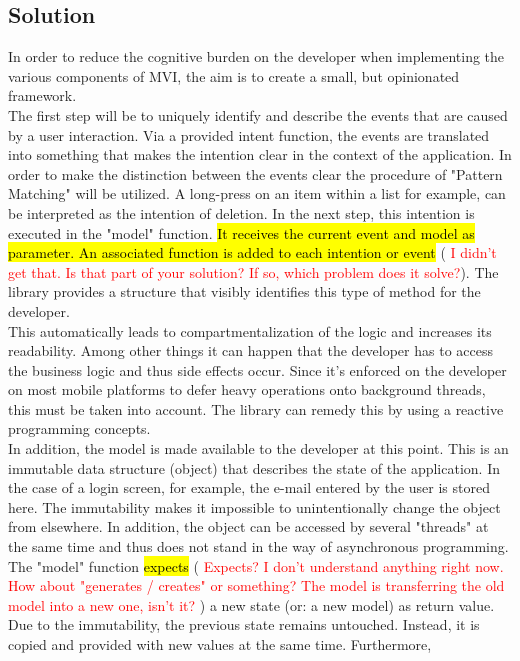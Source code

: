 \subsection{Solution}
\label{subsec:solution}

In order to reduce the cognitive burden on the developer when implementing the various components of MVI, the aim 
is to create a small, but opinionated framework.
\\
The first step will be to uniquely identify and describe the events that are caused by a user interaction.
Via a provided intent function, the events are translated into something that makes the intention clear in the context of the application.
In order to make the distinction between the events clear the procedure of "Pattern Matching" 
\cite{}
will be utilized. A long-press on an item within a list for example, can be interpreted as the intention of deletion. In the next step, this intention is executed in 
the "model" function. \hl{It receives the current event and model as parameter. An associated function is added to each intention or event} (
\textcolor{red}{I didn't get that. Is that part of your solution? If so, which problem does it solve?}).
The library provides a structure that visibly identifies this type of method for the developer.
\\
This automatically leads to compartmentalization of the logic and increases its readability. Among other things it can happen that the developer has to access the business 
logic
\cite{} 
and thus side effects 
\cite{}
occur. Since it's enforced on the developer on most mobile platforms to defer heavy operations onto background threads, this must be taken
into account. The library can remedy this by using a reactive programming concepts.
\\
In addition, the model is made available to the developer at this point. This is an immutable data structure (object) that describes the state of the application. 
In the case of a login screen, for example, the e-mail entered by the user is stored here. The immutability makes it impossible to unintentionally change the object from elsewhere. 
In addition, the object can be accessed by several "threads" at the same time and thus does not stand in the way of asynchronous programming. The "model" function 
\hl{expects} (
    \textcolor{red}{Expects? I don't understand anything right now. How about "generates / creates" or something? The model is transferring the old model into a new one, isn't it?}
) a new state 
(or: a new model) as return value. Due to the immutability, the previous state remains untouched. Instead, it is copied and provided with new values at the same time. Furthermore, 
